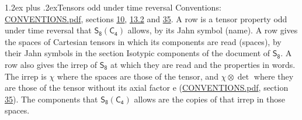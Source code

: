 \documentclass[10pt,a4paper]{article}
\makeatletter
\renewcommand\section{\@startsection{section}{1}{\z@}{-3ex plus -1ex minus -.2ex}%
  {1.2ex plus .2ex}{\normalfont\large\sffamily\bfseries\color{parttitle}}}
\numberwithin{equation}{section}
\newcommand{\grp}[1]{\mathsf{#1}}
\newcommand{\irrprod}{\otimes}
\makeatother
\begin{document}
\section{Tensors odd under time reversal}\label{s:time_odd}
Conventions: \href{../../CONVENTIONS.pdf}{CONVENTIONS.pdf}, sections \href{../../../rotation/CONVENTIONS.pdf\#conv.10}{10}, \href{../../../rotation/CONVENTIONS.pdf\#conv.13.2}{13.2} and \href{../../CONVENTIONS.pdf\#conv.35}{35}.
\leavevmode\label{n:head.name.property}A row is a tensor property odd under time reversal that $\grp{S_{8}}(\grp{C_{4}})$ allows, by its Jahn symbol (name). \label{n:head.spaces}A row gives the spaces of Cartesian tensors in which its components are read (spaces), by their Jahn symbols in the section Isotypic components of the document of \href{../../../rotation/data/pdf/S8.pdf}{$\grp{S_{8}}$}. \label{n:head.properties}A row also gives the irrep of $\grp{S_{8}}$ at which they are read and the properties in words. The irrep is $\chi$ where the spaces are those of the tensor, and $\chi \irrprod \det$ where they are those of the tensor without its axial factor e (\href{../../CONVENTIONS.pdf}{CONVENTIONS.pdf}, section \href{../../CONVENTIONS.pdf\#conv.35}{35}). The components that $\grp{S_{8}}(\grp{C_{4}})$ allows are the copies of that irrep in those spaces.
\end{document}

